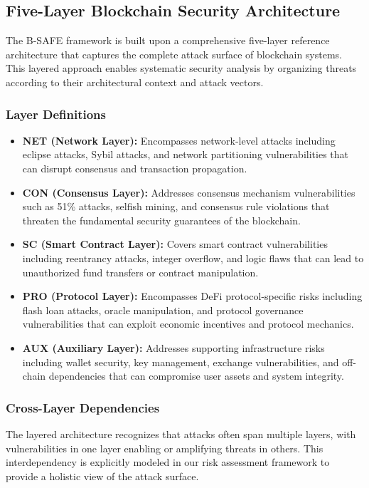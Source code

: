 \subsection{Five-Layer Blockchain Security Architecture}
\label{sec:methodology_architecture}

The B-SAFE framework is built upon a comprehensive five-layer reference architecture that captures the complete attack surface of blockchain systems. This layered approach enables systematic security analysis by organizing threats according to their architectural context and attack vectors.

\subsubsection{Layer Definitions}
\begin{itemize}
    \item \textbf{NET (Network Layer):} Encompasses network-level attacks including eclipse attacks, Sybil attacks, and network partitioning vulnerabilities that can disrupt consensus and transaction propagation.
    
    \item \textbf{CON (Consensus Layer):} Addresses consensus mechanism vulnerabilities such as 51\% attacks, selfish mining, and consensus rule violations that threaten the fundamental security guarantees of the blockchain.
    
    \item \textbf{SC (Smart Contract Layer):} Covers smart contract vulnerabilities including reentrancy attacks, integer overflow, and logic flaws that can lead to unauthorized fund transfers or contract manipulation.
    
    \item \textbf{PRO (Protocol Layer):} Encompasses DeFi protocol-specific risks including flash loan attacks, oracle manipulation, and protocol governance vulnerabilities that can exploit economic incentives and protocol mechanics.
    
    \item \textbf{AUX (Auxiliary Layer):} Addresses supporting infrastructure risks including wallet security, key management, exchange vulnerabilities, and off-chain dependencies that can compromise user assets and system integrity.
\end{itemize}

\subsubsection{Cross-Layer Dependencies}
The layered architecture recognizes that attacks often span multiple layers, with vulnerabilities in one layer enabling or amplifying threats in others. This interdependency is explicitly modeled in our risk assessment framework to provide a holistic view of the attack surface.
